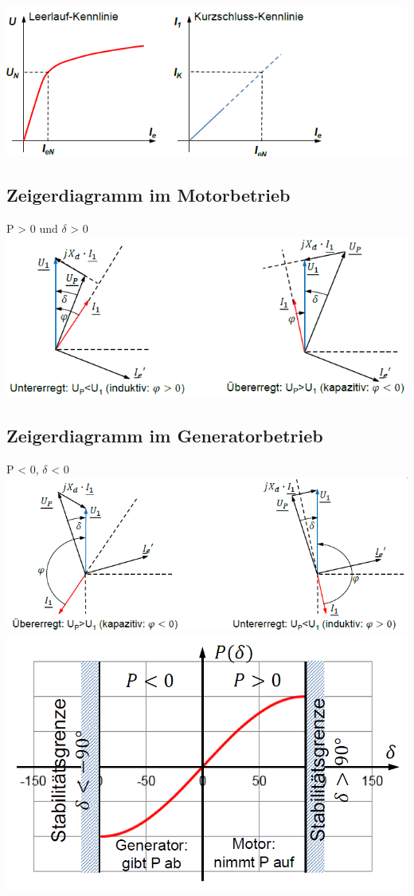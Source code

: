     \includegraphics[scale = 0.8]{images/KennlinieSynchronmaschine}
\subsection{Zeigerdiagramm im Motorbetrieb}
    P > 0 und $\delta$ > 0 \newline \newline
    \includegraphics[width = 12 cm]{images/ZeigerdiagrammSynchronmaschine}

\subsection{Zeigerdiagramm im Generatorbetrieb}
    P < 0, $\delta$ < 0  \newline
    \includegraphics[width = 12 cm]{images/ZeigerdiagrammGeneratorbetrieb} \newline \newline
    \includegraphics[scale = 0.4]{images/Stabilitaet}
\clearpage
\pagebreak
